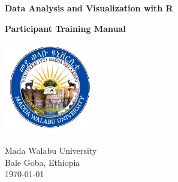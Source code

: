 

\begin{titlepage}
    \begin{center}
        \vspace*{1cm}
            
        \large
        \textbf{Data Analysis and Visualization with R}
            
        \vspace{1.5cm}
            
            \textbf{Participant Training Manual}
        
                \vspace{1.2cm}
       \includegraphics[width=0.3\textwidth]{fig/MWULogo.jpeg}
      
          \vspace{1.5cm}
         
         \small


        Mada Walabu University\\
             \vspace{0.5cm}
          \vspace{0.5cm}
        Bale Goba, Ethiopia\\
        \today
  
    \end{center}
\end{titlepage}
